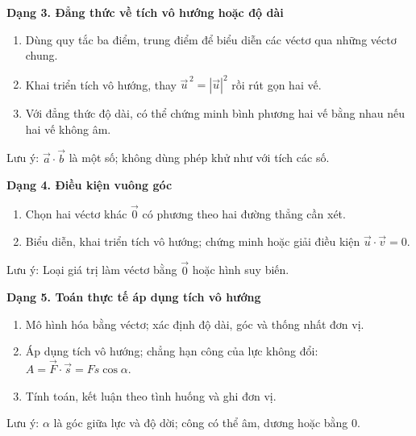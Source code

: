 \textbf{Dạng 3. Đẳng thức về tích vô hướng hoặc độ dài}
\begin{enumerate}
\item Dùng quy tắc ba điểm, trung điểm để biểu diễn các véctơ qua những véctơ chung.
\item Khai triển tích vô hướng, thay $\overrightarrow{u}^{\,2}=|\overrightarrow{u}|^2$ rồi rút gọn hai vế.
\item Với đẳng thức độ dài, có thể chứng minh bình phương hai vế bằng nhau nếu hai vế không âm.
\end{enumerate}
Lưu ý: $\overrightarrow{a}\cdot\overrightarrow{b}$ là một số; không dùng phép khử như với tích các số.

\textbf{Dạng 4. Điều kiện vuông góc}
\begin{enumerate}
\item Chọn hai véctơ khác $\overrightarrow{0}$ có phương theo hai đường thẳng cần xét.
\item Biểu diễn, khai triển tích vô hướng; chứng minh hoặc giải điều kiện $\overrightarrow{u}\cdot\overrightarrow{v}=0$.
\end{enumerate}
Lưu ý: Loại giá trị làm véctơ bằng $\overrightarrow{0}$ hoặc hình suy biến.

\textbf{Dạng 5. Toán thực tế áp dụng tích vô hướng}
\begin{enumerate}
\item Mô hình hóa bằng véctơ; xác định độ dài, góc và thống nhất đơn vị.
\item Áp dụng tích vô hướng; chẳng hạn công của lực không đổi: $A=\overrightarrow{F}\cdot\overrightarrow{s}=Fs\cos\alpha$.
\item Tính toán, kết luận theo tình huống và ghi đơn vị.
\end{enumerate}
Lưu ý: $\alpha$ là góc giữa lực và độ dời; công có thể âm, dương hoặc bằng $0$.
